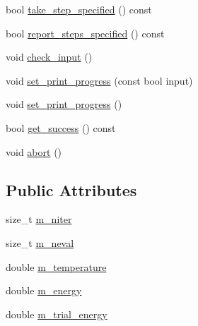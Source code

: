 \begin{DoxyCompactItemize}
\item 
bool \hyperlink{classmcpele_1_1MC_af0c4c8dcf99b125917644ee5744d4ed6}{take\-\_\-step\-\_\-specified} () const 
\item 
bool \hyperlink{classmcpele_1_1MC_aa822dbcc2c5e3d2489880c5f16cb1dfd}{report\-\_\-steps\-\_\-specified} () const 
\item 
void \hyperlink{classmcpele_1_1MC_a3682931dc32796af0c7051ce3311c54f}{check\-\_\-input} ()
\item 
void \hyperlink{classmcpele_1_1MC_ab16a83837236952cac564a9f319ea7a1}{set\-\_\-print\-\_\-progress} (const bool input)
\item 
void \hyperlink{classmcpele_1_1MC_a071420a97e409024070d9c4580f8fe51}{set\-\_\-print\-\_\-progress} ()
\item 
bool \hyperlink{classmcpele_1_1MC_a18448513c2ed188169f3e26a3c431300}{get\-\_\-success} () const 
\item 
void \hyperlink{classmcpele_1_1MC_a9277bffe822241e2138dd1de6db320f4}{abort} ()
\end{DoxyCompactItemize}
\subsection*{\-Public \-Attributes}
\begin{DoxyCompactItemize}
\item 
size\-\_\-t \hyperlink{classmcpele_1_1MC_a570b47c5f340c2afda0a519f1225eba9}{m\-\_\-niter}
\item 
size\-\_\-t \hyperlink{classmcpele_1_1MC_a678adb43213ef8da3a8b7620a8ff4d6e}{m\-\_\-neval}
\item 
double \hyperlink{classmcpele_1_1MC_ac96652882e0e578172de302578be5b88}{m\-\_\-temperature}
\item 
double \hyperlink{classmcpele_1_1MC_a61af4e6db5014d3ab4251dd38aca68f5}{m\-\_\-energy}
\item 
double \hyperlink{classmcpele_1_1MC_a956f949abbf2bd055e72924cb136f3e7}{m\-\_\-trial\-\_\-energy}
\end{DoxyCompactItemize}
